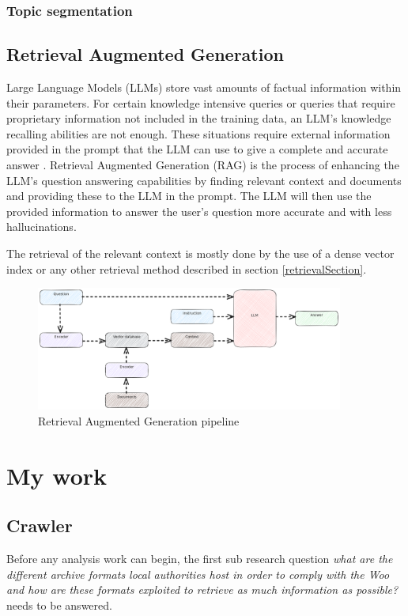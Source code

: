 \documentclass[twoside]{uva-inf-bachelor-thesis}
\begin{document}
\subsection{Topic segmentation}
\lipsum[4]

\section{Retrieval Augmented Generation}
Large Language Models (LLMs) store vast amounts of factual information within their parameters. For certain knowledge intensive queries or queries that require proprietary information not included in the training data, an LLM's knowledge recalling abilities are not enough. These situations require external information provided in the prompt that the LLM can use to give a complete and accurate answer \cite{NEURIPS2020_6b493230}. Retrieval Augmented Generation (RAG) is the process of enhancing the LLM's question answering capabilities by finding relevant context and documents and providing these to the LLM in the prompt. The LLM will then use the provided information to answer the user's question more accurate and with less hallucinations.

The retrieval of the relevant context is mostly done by the use of a dense vector index or any other retrieval method described in section \ref{retrievalSection}.

\begin{figure}
    \centering
    \includegraphics[width=0.9\textwidth]{images/rag.png}
    \caption{Retrieval Augmented Generation pipeline}
    \label{fig:pyanres}
\end{figure}


\chapter{My work}
\section{Crawler}
Before any analysis work can begin, the first sub research question \textit{what are the different archive formats local authorities host in order to comply with the Woo and how are these formats exploited to retrieve as much information as possible?} needs to be answered. 
\end{document}
